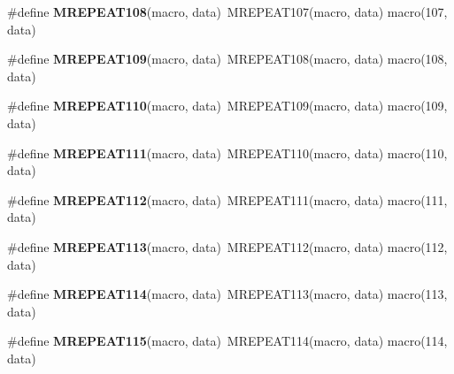 \begin{DoxyCompactItemize}
\item 
\hypertarget{group__group__sam0__utils__mrepeat_gacfbea84aacb4958d50fc747c7f512dcb}{}\#define {\bfseries M\+R\+E\+P\+E\+A\+T108}(macro,  data)~M\+R\+E\+P\+E\+A\+T107(macro, data)   macro(107, data)\label{group__group__sam0__utils__mrepeat_gacfbea84aacb4958d50fc747c7f512dcb}

\item 
\hypertarget{group__group__sam0__utils__mrepeat_ga3756d19974e9584f0e8f0c6e404c8f61}{}\#define {\bfseries M\+R\+E\+P\+E\+A\+T109}(macro,  data)~M\+R\+E\+P\+E\+A\+T108(macro, data)   macro(108, data)\label{group__group__sam0__utils__mrepeat_ga3756d19974e9584f0e8f0c6e404c8f61}

\item 
\hypertarget{group__group__sam0__utils__mrepeat_ga7ada858a2020e79d348db928bc0b886b}{}\#define {\bfseries M\+R\+E\+P\+E\+A\+T110}(macro,  data)~M\+R\+E\+P\+E\+A\+T109(macro, data)   macro(109, data)\label{group__group__sam0__utils__mrepeat_ga7ada858a2020e79d348db928bc0b886b}

\item 
\hypertarget{group__group__sam0__utils__mrepeat_gaa95d8fb6f36efe2095bac8dee72ffb69}{}\#define {\bfseries M\+R\+E\+P\+E\+A\+T111}(macro,  data)~M\+R\+E\+P\+E\+A\+T110(macro, data)   macro(110, data)\label{group__group__sam0__utils__mrepeat_gaa95d8fb6f36efe2095bac8dee72ffb69}

\item 
\hypertarget{group__group__sam0__utils__mrepeat_ga9e7619019279e0bb7b52e9825bac227d}{}\#define {\bfseries M\+R\+E\+P\+E\+A\+T112}(macro,  data)~M\+R\+E\+P\+E\+A\+T111(macro, data)   macro(111, data)\label{group__group__sam0__utils__mrepeat_ga9e7619019279e0bb7b52e9825bac227d}

\item 
\hypertarget{group__group__sam0__utils__mrepeat_ga41f4b4f9d9ce5b392cfa10804e69b163}{}\#define {\bfseries M\+R\+E\+P\+E\+A\+T113}(macro,  data)~M\+R\+E\+P\+E\+A\+T112(macro, data)   macro(112, data)\label{group__group__sam0__utils__mrepeat_ga41f4b4f9d9ce5b392cfa10804e69b163}

\item 
\hypertarget{group__group__sam0__utils__mrepeat_gab7df5ef1e6f0f3980e9e94b701ecd4dd}{}\#define {\bfseries M\+R\+E\+P\+E\+A\+T114}(macro,  data)~M\+R\+E\+P\+E\+A\+T113(macro, data)   macro(113, data)\label{group__group__sam0__utils__mrepeat_gab7df5ef1e6f0f3980e9e94b701ecd4dd}

\item 
\hypertarget{group__group__sam0__utils__mrepeat_ga065e40294f3d496aa0d661ef472f7914}{}\#define {\bfseries M\+R\+E\+P\+E\+A\+T115}(macro,  data)~M\+R\+E\+P\+E\+A\+T114(macro, data)   macro(114, data)\label{group__group__sam0__utils__mrepeat_ga065e40294f3d496aa0d661ef472f7914}


\end{DoxyCompactItemize}
